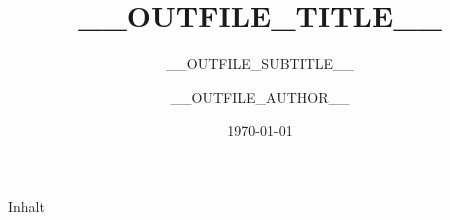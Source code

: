 \documentclass[aspectratio=169]{beamer}
\title{__OUTFILE_TITLE__}
\subtitle{__OUTFILE_SUBTITLE__}
\author{__OUTFILE_AUTHOR__}
\institute{__OUTFILE_INSTITUTE__}
\date{\today}
\begin{document}

\begin{frame}
	\titlepage
\end{frame}

\begin{frame}{Inhalt}
	\tableofcontents
\end{frame}

\makeatother


\end{document}

